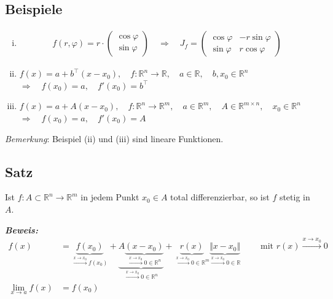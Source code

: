 \documentclass[11pt,a4paper]{book}
\newcommand {\R}	{\mathbb{R}}
\newcommand {\Rn}	{\mathbb{R}^n}
\newcommand {\Rm}	{\mathbb{R}^m}
\newcommand {\Rmxn}	{\mathbb{R}^{m \times n}}
\newcommand{\1}    	{\mathbbm{1}}
\newcommand{\mitt}	{\textrm{ mit }}
\newcommand{\Beweis}[1][Beweis]
{\begin{mdframed}[backgroundcolor=gray!10,linewidth=0pt]\noindent\textit{\textbf{{#1}:}}~}
\newcommand{\QED}	{\end{mdframed}}
\begin{document}
\subsection{Beispiele}
\begin{enumerate}[(i)]
	\item \begin{align*}
		f(r,\varphi) = r \cdot \left( \begin{array}{c} \cos \varphi \\ \sin \varphi \end{array} \right) \quad \Rightarrow \quad J_f = \left( \begin{array}{cc}
			\cos \varphi & -r \sin \varphi \\
			\sin \varphi & r \cos \varphi
		\end{array} \right)
	\end{align*}
	\item \(f(x) = a + b^\top(x - x_0), \quad f : \Rn \rightarrow \R, \quad a \in \R, \quad b,x_0 \in \Rn\) \\
	\(\Rightarrow \quad f(x_0) = a, \quad f'(x_0) = b^\top \)
	\item \(f(x) = a + A(x - x_0), \quad f : \Rn \rightarrow \Rm, \quad a \in \Rm, \quad A \in \Rmxn, \quad x_0 \in \Rn\) \\
	\(\Rightarrow \quad f(x_0) = a, \quad f'(x_0) = A \)
\end{enumerate}
\textit{Bemerkung}: Beispiel (ii) und (iii) sind lineare Funktionen.

\subsection{Satz}
Ist \(f : A \subset \Rn \rightarrow \Rm\) in jedem Punkt \(x_0 \in A\) total differenzierbar, so ist \(f\) stetig in \(A\). \\

\Beweis
\begin{align*}
	f(x) &= \underbrace{f(x_0)}_{\stackrel{x \rightarrow x_0}{\rightarrow} f(x_0)} + 
	\underbrace{A \underbrace{(x-x_0)}_{\stackrel{x \rightarrow x_0}{\rightarrow} 0 \in \Rn}}_{\stackrel{x \rightarrow x_0}{\rightarrow} 0 \in \Rn} + 
	\underbrace{r(x)}_{\stackrel{x \rightarrow x_0}{\rightarrow} 0 \in \Rm} 
	\underbrace{\Vert x - x_0 \Vert}_{\stackrel{x \rightarrow x_0}{\rightarrow} 0 \in \R}
	\qquad \mitt r(x) \stackrel{x \rightarrow x_0}{\rightarrow} 0 \\
	\lim_{x \rightarrow a} f(x) &= f(x_0)
\end{align*}
\QED
\end{document}
